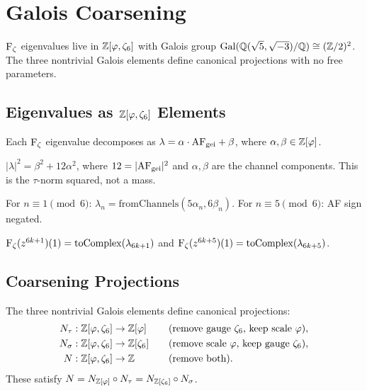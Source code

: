 \chapter{Galois Coarsening}
\label{ch:coarsening}

$\operatorname{F_\zeta}$ eigenvalues live in $\mathbb{Z}[\varphi,\zeta_6]$ with Galois group
$\mathrm{Gal}(\mathbb{Q}(\sqrt5,\sqrt{-3})/\mathbb{Q}) \cong (\mathbb{Z}/2)^2$.
The three nontrivial Galois elements define canonical projections
with no free parameters.

\section{Eigenvalues as \texorpdfstring{$\mathbb{Z}[\varphi,\zeta_6]$}{Z[φ,ζ₆]} Elements}

\begin{definition}
\label{def:from-channels}
Each $\operatorname{F_\zeta}$ eigenvalue decomposes as
$\lambda = \alpha \cdot \mathrm{AF}_{\mathrm{gei}} + \beta$,
where $\alpha, \beta \in \mathbb{Z}[\varphi]$.
\end{definition}

\begin{theorem}
\label{thm:tau-norm-formula}
$|\lambda|^2 = \beta^2 + 12\alpha^2$,
where $12 = |\mathrm{AF}_{\mathrm{gei}}|^2$ and
$\alpha, \beta$ are the channel components.
This is the $\tau$-norm squared, not a mass.
\end{theorem}

\begin{definition}
\label{def:eigenGEI}
For $n \equiv 1 \pmod{6}$:
$\lambda_n = \mathrm{fromChannels}(5\alpha_n, 6\beta_n)$.
For $n \equiv 5 \pmod{6}$: AF sign negated.
\end{definition}

\begin{theorem}
\label{thm:eigenvalue-bridge}
$\operatorname{F_\zeta}(z^{6k+1})(1) = \mathrm{toComplex}(\lambda_{6k+1})$ and
$\operatorname{F_\zeta}(z^{6k+5})(1) = \mathrm{toComplex}(\lambda_{6k+5})$.
\end{theorem}

\section{Coarsening Projections}

The three nontrivial Galois elements define canonical projections:
\begin{align*}
  N_\tau &: \mathbb{Z}[\varphi,\zeta_6] \to \mathbb{Z}[\varphi] &\quad&\text{(remove gauge $\zeta_6$, keep scale $\varphi$)},\\
  N_\sigma &: \mathbb{Z}[\varphi,\zeta_6] \to \mathbb{Z}[\zeta_6] &\quad&\text{(remove scale $\varphi$, keep gauge $\zeta_6$)},\\
  N &: \mathbb{Z}[\varphi,\zeta_6] \to \mathbb{Z} &\quad&\text{(remove both)}.
\end{align*}
These satisfy $N = N_{\mathbb{Z}[\varphi]} \circ N_\tau = N_{\mathbb{Z}[\zeta_6]} \circ N_\sigma$.

